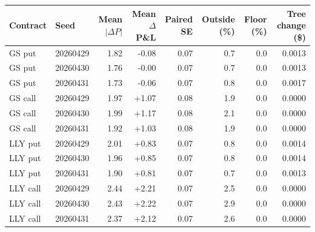\begin{tabular}{llrrrrrr}
\toprule
Contract & Seed & Mean $|\Delta P|$ & Mean $\Delta$P\&L & Paired SE & Outside (\%) & Floor (\%) & Tree change (\$) \\
\midrule
GS put & 20260429 & 1.82 & -0.08 & 0.07 & 0.7 & 0.0 & 0.0013 \\
GS put & 20260430 & 1.76 & -0.00 & 0.07 & 0.7 & 0.0 & 0.0013 \\
GS put & 20260431 & 1.73 & -0.06 & 0.07 & 0.8 & 0.0 & 0.0017 \\
GS call & 20260429 & 1.97 & +1.07 & 0.08 & 1.9 & 0.0 & 0.0000 \\
GS call & 20260430 & 1.99 & +1.17 & 0.08 & 2.1 & 0.0 & 0.0000 \\
GS call & 20260431 & 1.92 & +1.03 & 0.08 & 1.9 & 0.0 & 0.0000 \\
LLY put & 20260429 & 2.01 & +0.83 & 0.07 & 0.8 & 0.0 & 0.0014 \\
LLY put & 20260430 & 1.96 & +0.85 & 0.07 & 0.8 & 0.0 & 0.0014 \\
LLY put & 20260431 & 1.90 & +0.81 & 0.07 & 0.7 & 0.0 & 0.0013 \\
LLY call & 20260429 & 2.44 & +2.21 & 0.07 & 2.5 & 0.0 & 0.0000 \\
LLY call & 20260430 & 2.43 & +2.22 & 0.07 & 2.9 & 0.0 & 0.0000 \\
LLY call & 20260431 & 2.37 & +2.12 & 0.07 & 2.6 & 0.0 & 0.0000 \\
\bottomrule
\end{tabular}
